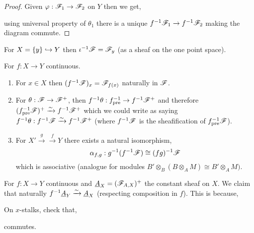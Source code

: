 \documentclass[12pt]{article}
\begin{document}
\begin{proof}
Given $\varphi : \mathscr{F}_1 \to \mathscr{F}_2$ on $Y$ then we get,
\begin{center}
\end{center}
using universal property of $\theta_1$ there is a unique $f^{-1} \mathscr{F}_1 \to f^{-1} \mathscr{F}_2$ making the diagram commute. 
\end{proof}

\begin{example}
For $X = \{ y \} \hookrightarrow Y$ then $\iota^{-1} \mathscr{F} = \mathscr{F}_y$ (as a sheaf on the one point space).
\end{example}

\begin{thm}
For $f : X \to Y$ continuous. 
\begin{enumerate}
\item For $x \in X$ then $(f^{-1} \mathscr{F})_{x} = \mathscr{F}_{f(x)}$ naturally in $\mathscr{F}$.
\item For $\theta : \mathscr{F} \to \mathscr{F}^+$, then $f^{-1} \theta : f^{-1}_{\text{pre}} \to f^{-1} \mathscr{F}^+$ and therefore $(f^{-1}_{\text{pre}} \mathscr{F})^+ \xrightarrow{\sim} f^{-1} \mathscr{F}^+$ which we could write as saying $f^{-1} \theta : f^{-1} \mathscr{F} \xrightarrow{\sim} f^{-1} \mathscr{F}^+$ (where $f^{-1} \mathscr{F}$ is the sheafification of $f^{-1}_{\text{pre}} \mathscr{F}$). 
\item For $X' \xrightarrow{g} \xrightarrow{f} Y$ there exists a natural isomorphism,
\[ \alpha_{f,g} : g^{-1} (f^{-1} \mathscr{F}) \cong (fg)^{-1} \mathscr{F} \]
which is associative (analogue for modules $B' \otimes_B (B \otimes_A M) \cong B' \otimes_A M)$. 
\end{enumerate}
\end{thm}

\begin{example}
For $f : X \to Y$ continuous and $\underline{A}_X = (\mathscr{F}_{A,X})^+$ the constant sheaf on $X$. We claim that naturally $f^{-1} \underline{A}_Y \xrightarrow{\sim} \underline{A}_X$ (respecting composition in $f$). This is because,
\begin{center}
\end{center}
On $x$-stalks, check that,
\begin{center}
\end{center}
commutes.
\end{example}
\end{document}

